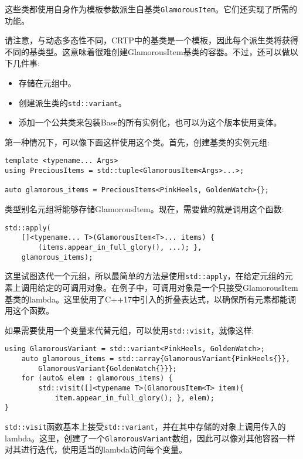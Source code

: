 这些类都使用自身作为模板参数派生自基类\texttt{GlamorousItem}。它们还实现了所需的功能。

请注意，与动态多态性不同，CRTP中的基类是一个模板，因此每个派生类将获得不同的基类型。这意味着很难创建GlamorousItem基类的容器。不过，还可以做以下几件事:

\begin{itemize}
\item 
存储在元组中。

\item 
创建派生类的\texttt{std::variant}。

\item 
添加一个公共类来包装Base的所有实例化，也可以为这个版本使用变体。
\end{itemize}

第一种情况下，可以像下面这样使用这个类。首先，创建基类的实例元组:

\begin{lstlisting}[style=styleCXX]
template <typename... Args>
using PreciousItems = std::tuple<GlamorousItem<Args>...>;

auto glamorous_items = PreciousItems<PinkHeels, GoldenWatch>{};
\end{lstlisting}

类型别名元组将能够存储GlamorousItem。现在，需要做的就是调用这个函数:

\begin{lstlisting}[style=styleCXX]
std::apply(
	[]<typename... T>(GlamorousItem<T>... items) {
		(items.appear_in_full_glory(), ...); },
	glamorous_items);
\end{lstlisting}

这里试图迭代一个元组，所以最简单的方法是使用\texttt{std::apply}，在给定元组的元素上调用给定的可调用对象。在例子中，可调用对象是一个只接受GlamorousItem基类的lambda。这里使用了C++17中引入的折叠表达式，以确保所有元素都能调用这个函数。

如果需要使用一个变量来代替元组，可以使用\texttt{std::visit}，就像这样:

\begin{lstlisting}[style=styleCXX]
	using GlamorousVariant = std::variant<PinkHeels, GoldenWatch>;
	auto glamorous_items = std::array{GlamorousVariant{PinkHeels{}},
		GlamorousVariant{GoldenWatch{}}};
	for (auto& elem : glamorous_items) {
		std::visit([]<typename T>(GlamorousItem<T> item){
			item.appear_in_full_glory(); }, elem);
}
\end{lstlisting}

\texttt{std::visit}函数基本上接受\texttt{std::variant}，并在其中存储的对象上调用传入的lambda。这里，创建了一个\texttt{GlamorousVariant}数组，因此可以像对其他容器一样对其进行迭代，使用适当的lambda访问每个变量。

